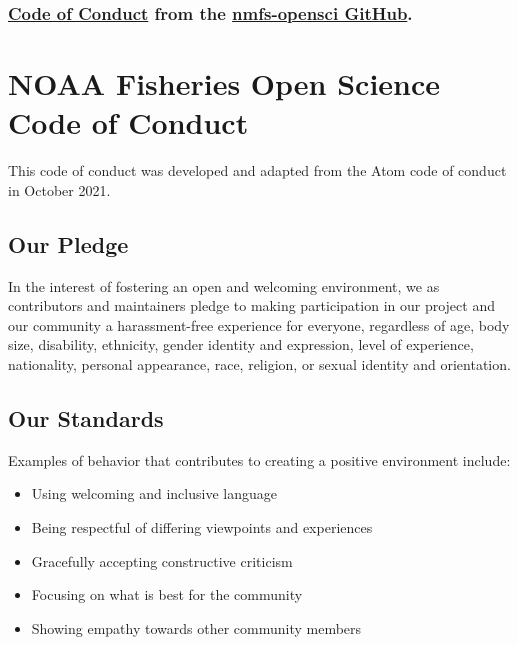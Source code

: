 \documentclass[
  letterpaper,
  oneside,
  open=any]{scrbook}
\providecommand{\tightlist}{%
  \setlength{\itemsep}{0pt}\setlength{\parskip}{0pt}}\usepackage{longtable,booktabs,array}
\begin{document}
\hypertarget{code-of-conduct-from-the-nmfs-opensci-github.}{%
\subsection{\texorpdfstring{\href{https://github.com/nmfs-opensci/.github/blob/main/CODE_OF_CONDUCT.md}{Code
of Conduct} from the \href{https://nmfs-opensci.github.io/}{nmfs-opensci
GitHub}.}{Code of Conduct from the nmfs-opensci GitHub.}}\label{code-of-conduct-from-the-nmfs-opensci-github.}}

\hypertarget{noaa-fisheries-open-science-code-of-conduct}{%
\chapter{NOAA Fisheries Open Science Code of
Conduct}\label{noaa-fisheries-open-science-code-of-conduct}}

This code of conduct was developed and adapted from the Atom code of
conduct in October 2021.

\hypertarget{our-pledge}{%
\section{Our Pledge}\label{our-pledge}}

In the interest of fostering an open and welcoming environment, we as
contributors and maintainers pledge to making participation in our
project and our community a harassment-free experience for everyone,
regardless of age, body size, disability, ethnicity, gender identity and
expression, level of experience, nationality, personal appearance, race,
religion, or sexual identity and orientation.

\hypertarget{our-standards}{%
\section{Our Standards}\label{our-standards}}

Examples of behavior that contributes to creating a positive environment
include:

\begin{itemize}
\tightlist
\item
  Using welcoming and inclusive language
\item
  Being respectful of differing viewpoints and experiences
\item
  Gracefully accepting constructive criticism
\item
  Focusing on what is best for the community
\item
  Showing empathy towards other community members
\end{itemize}
\end{document}
